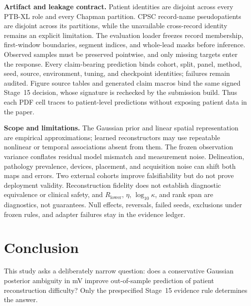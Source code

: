 \documentclass{article}
\begin{document}
\noindent\textbf{Artifact and leakage contract.}  Patient identities are disjoint across every
PTB-XL role and every Chapman partition.  CPSC record-name pseudopatients are disjoint across its
partitions, while the unavailable cross-record identity remains an explicit limitation.  The evaluation loader freezes record
membership, first-window boundaries, segment indices, and whole-lead masks before inference.
Observed samples must be preserved pointwise, and only missing targets enter the response.  Every
claim-bearing prediction binds cohort, split, panel, method, seed, source, environment, tuning, and
checkpoint identities; failures remain audited.  Figure source tables and generated claim macros
bind the same signed Stage~15 decision, whose signature is rechecked by the submission build.  Thus
each PDF cell traces to patient-level predictions without exposing patient data in the paper.

\noindent\textbf{Scope and limitations.}  The Gaussian prior and linear spatial representation are
empirical approximations; learned reconstructors may use repeatable nonlinear or temporal
associations absent from them.  The frozen observation variance conflates residual model mismatch
and measurement noise.  Delineation, pathology prevalence, devices, placement, and acquisition
noise can shift both maps and errors.  Two external cohorts improve falsifiability but do not prove
deployment validity.  Reconstruction fidelity does not establish diagnostic equivalence or
clinical safety, and $R_{\mathrm{lower}}$, $\eta$, $\log_{10}\kappa$, and rank span are diagnostics,
not guarantees.  Null effects, reversals, failed seeds, exclusions under frozen rules, and adapter
failures stay in the evidence ledger.

\section{Conclusion}
This study asks a deliberately narrow question: does a conservative Gaussian posterior ambiguity
in mV improve out-of-sample prediction of patient reconstruction difficulty?  Only the
prespecified Stage~15 evidence rule determines the answer.  \ResultConclusion
\label{technical-content-end}

\clearpage



\end{document}
